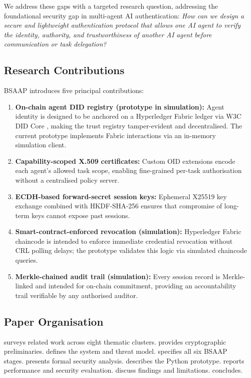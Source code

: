 \documentclass[review,5p,twocolumn,times]{elsarticle}
\begin{document}
We address these gaps with a targeted research question,
addressing the foundational security gap in multi-agent AI authentication:
\emph{How can we design a secure and
lightweight authentication protocol that allows one AI agent to verify the
identity, authority, and trustworthiness of another AI agent before
communication or task delegation?}

\subsection{Research Contributions}

BSAAP introduces five principal contributions:

\begin{enumerate}
  \item \textbf{On-chain agent DID registry (prototype in simulation):}
    Agent identity is designed to be anchored on
    a Hyperledger Fabric ledger via W3C DID Core \cite{w3c2022did}, making
    the trust registry tamper-evident and decentralised. The current prototype
    implements Fabric interactions via an in-memory simulation client.
  \item \textbf{Capability-scoped X.509 certificates:} Custom OID extensions
    encode each agent's allowed task scope, enabling fine-grained per-task
    authorisation without a centralised policy server.
  \item \textbf{ECDH-based forward-secret session keys:} Ephemeral X25519
    key exchange \cite{rfc7748} combined with HKDF-SHA-256 \cite{rfc5869}
    ensures that compromise of long-term keys cannot expose past sessions.
  \item \textbf{Smart-contract-enforced revocation (simulation):} Hyperledger
    Fabric chaincode is intended to enforce immediate credential revocation
    without CRL polling delays; the prototype validates this logic via
    simulated chaincode queries.
  \item \textbf{Merkle-chained audit trail (simulation):} Every session record
    is Merkle-linked and intended for on-chain commitment, providing an
    accountability trail verifiable by any authorised auditor.
\end{enumerate}

\subsection{Paper Organisation}

 surveys related work across eight thematic clusters.
 provides cryptographic preliminaries.
 defines the system and threat model.
 specifies all six BSAAP stages.
 presents formal security analysis.
 describes the Python prototype.
 reports performance and security evaluation.
 discuss findings and limitations.
 concludes.
\end{document}
